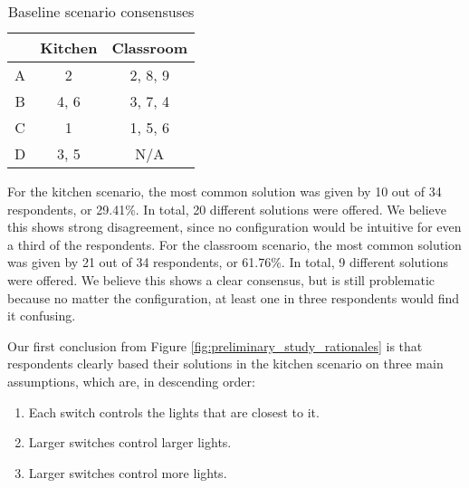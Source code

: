 \clearpage

\begin{table}
    \centering
    \begin{tabular}{|c|c|c|} 
    \hline
      & Kitchen & Classroom \\
    \hline
    A & 2       & 2, 8, 9   \\
    B & 4, 6    & 3, 7, 4   \\
    C & 1       & 1, 5, 6   \\
    D & 3, 5    & N/A       \\
    \hline
\end{tabular}
\caption{Baseline scenario consensuses}
\label{table:preliminary_study_consensus}
\end{table}

For the kitchen scenario, the most common solution was given by 10 out of 34 respondents, or 29.41\%. In total, 20 different solutions were offered. We believe this shows strong disagreement, since no configuration would be intuitive for even a third of the respondents. For the classroom scenario, the most common solution was given by 21 out of 34 respondents, or 61.76\%. In total, 9 different solutions were offered. We believe this shows a clear consensus, but is still problematic because no matter the configuration, at least one in three respondents would find it confusing.




Our first conclusion from Figure \ref{fig:preliminary_study_rationales} is that respondents clearly based their solutions in the kitchen scenario on three main assumptions, which are, in descending order:

\begin{enumerate}
    \item Each switch controls the lights that are closest to it.
    \item Larger switches control larger lights.
    \item Larger switches control more lights.
\end{enumerate}

